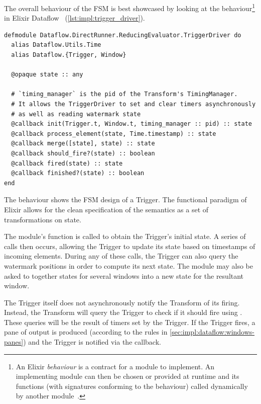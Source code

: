 The overall behaviour of the FSM is best showcased by looking at the  behaviour\footnote{An Elixir \emph{behaviour} is a contract for a module to implement. An implementing module can then be chosen or provided at runtime and its functions (with signatures conforming to the behaviour) called dynamically by another module~\cite[281]{Thomas:2016}.} in Elixir Dataflow ~(\cref{lst:impl:trigger_driver}).

\begin{listing}[h]
	\begin{verbatim}
defmodule Dataflow.DirectRunner.ReducingEvaluator.TriggerDriver do
  alias Dataflow.Utils.Time
  alias Dataflow.{Trigger, Window}
  
  @opaque state :: any
  
  # `timing_manager` is the pid of the Transform's TimingManager.
  # It allows the TriggerDriver to set and clear timers asynchronously
  # as well as reading watermark state
  @callback init(Trigger.t, Window.t, timing_manager :: pid) :: state
  @callback process_element(state, Time.timestamp) :: state
  @callback merge([state], state) :: state
  @callback should_fire?(state) :: boolean
  @callback fired(state) :: state
  @callback finished?(state) :: boolean
end
	\end{verbatim}
\caption[The  behaviour showing the Finite State Machine design of a Trigger.]{The  behaviour shows the FSM design of a Trigger. The functional paradigm of Elixir allows for the clean specification of the semantics as a set of transformations on state.}
\label{lst:impl:trigger_driver}
\end{listing}

The module's  function is called to obtain the Trigger's initial state.
A series of  calls then occurs, allowing the Trigger to update its state based on timestamps of incoming elements.
During any of these calls, the Trigger can also query the watermark positions in order to compute its next state.
The module may also be asked to  together states for several windows into a new state for the resultant window.

The Trigger itself does not asynchronously notify the Transform of its firing.
Instead, the Transform will query the Trigger to check if it should fire using .
These queries will be the result of timers set by the Trigger.
If the Trigger fires, a pane of output is produced (according to the rules in \cref{sec:impl:dataflow:windows-panes}) and the Trigger is notified via the  callback.

